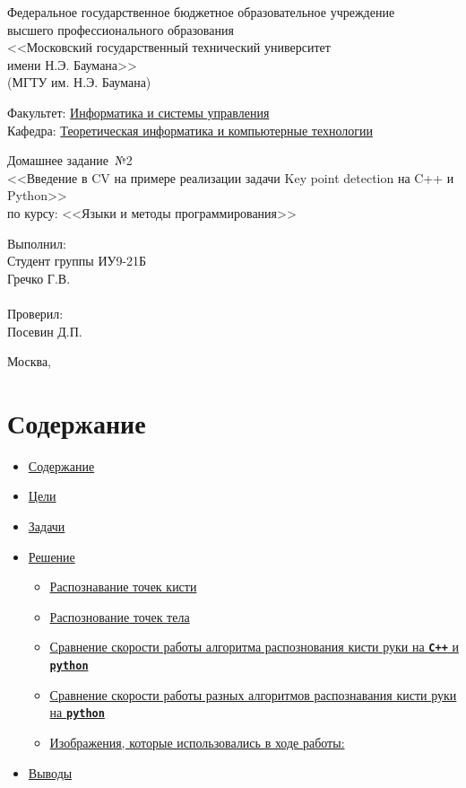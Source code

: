 \documentclass[
  12pt,
  a4paper,
]{article}
\providecommand{\tightlist}{%
  \setlength{\itemsep}{0pt}\setlength{\parskip}{0pt}}
\newcommand{\worktype}{Домашнее задание}
\newcommand{\thetitle}{Введение в CV на примере реализации задачи Key
point detection на C++ и Python}
\newcommand{\theauthor}{Гречко Г.В.}
\newcommand{\theteacher}{Посевин Д.П.}
\newcommand{\thegroup}{ИУ9-21Б}
\newcommand{\thecourse}{Языки и методы программирования}
\newcommand{\thenumber}{№2}
\renewcommand{\maketitle}
{
\newgeometry{
  left=0.7in,
  right=0.7in,
}
\begin{titlepage}
    \centering
    Федеральное государственное бюджетное образовательное учреждение\\
    высшего профессионального образования\\
    <<Московский государственный технический университет\\
    имени Н.Э. Баумана>>\\
    (МГТУ им. Н.Э. Баумана)
    \vspace{1cm}

    \flushleft

    Факультет: \underline{Информатика и системы управления}\\
    Кафедра: \underline{Теоретическая информатика и компьютерные технологии}

    \centering
    \topskip0pt
    \vspace*{\fill}
    \worktype\ \thenumber{}\\
    <<\thetitle{}>>\\
    по курсу: <<\thecourse{}>>
    \vspace*{\fill}
    \centering


    \hfill\begin{minipage}{0.4\linewidth}
        Выполнил:\\
        Студент группы \thegroup{}\\
        \theauthor\\
        \\
        Проверил:\\
        \theteacher
    \end{minipage}

    \vfill

    Москва, \the\year{}

\end{titlepage}
\restoregeometry{}
}
\begin{document}
\maketitle

\hypertarget{ux441ux43eux434ux435ux440ux436ux430ux43dux438ux435}{%
\section{Содержание}\label{ux441ux43eux434ux435ux440ux436ux430ux43dux438ux435}}

\begin{itemize}
\tightlist
\item
  \protect\hyperlink{ux441ux43eux434ux435ux440ux436ux430ux43dux438ux435}{Содержание}
\item
  \protect\hyperlink{ux446ux435ux43bux438}{Цели}
\item
  \protect\hyperlink{ux437ux430ux434ux430ux447ux438}{Задачи}
\item
  \protect\hyperlink{ux440ux435ux448ux435ux43dux438ux435}{Решение}

  \begin{itemize}
  \tightlist
  \item
    \protect\hyperlink{ux440ux430ux441ux43fux43eux437ux43dux430ux432ux430ux43dux438ux435-ux442ux43eux447ux435ux43a-ux43aux438ux441ux442ux438}{Распознавание
    точек кисти}
  \item
    \protect\hyperlink{ux440ux430ux441ux43fux43eux437ux43dux43eux432ux430ux43dux438ux435-ux442ux43eux447ux435ux43a-ux442ux435ux43bux430}{Распознование
    точек тела}
  \item
    \protect\hyperlink{ux441ux440ux430ux432ux43dux435ux43dux438ux435-ux441ux43aux43eux440ux43eux441ux442ux438-ux440ux430ux431ux43eux442ux44b-ux430ux43bux433ux43eux440ux438ux442ux43cux430-ux440ux430ux441ux43fux43eux437ux43dux43eux432ux430ux43dux438ux44f-ux43aux438ux441ux442ux438-ux440ux443ux43aux438-ux43dux430-c-ux438-python}{Сравнение
    скорости работы алгоритма распознования кисти руки на
    \textbf{\texttt{C++}} и \textbf{\texttt{python}}}
  \item
    \protect\hyperlink{ux441ux440ux430ux432ux43dux435ux43dux438ux435-ux441ux43aux43eux440ux43eux441ux442ux438-ux440ux430ux431ux43eux442ux44b-ux440ux430ux437ux43dux44bux445-ux430ux43bux433ux43eux440ux438ux442ux43cux43eux432-ux440ux430ux441ux43fux43eux437ux43dux430ux432ux430ux43dux438ux44f-ux43aux438ux441ux442ux438-ux440ux443ux43aux438-ux43dux430-python}{Сравнение
    скорости работы разных алгоритмов распознавания кисти руки на
    \textbf{\texttt{python}}}
  \item
    \protect\hyperlink{ux438ux437ux43eux431ux440ux430ux436ux435ux43dux438ux44f-ux43aux43eux442ux43eux440ux44bux435-ux438ux441ux43fux43eux43bux44cux437ux43eux432ux430ux43bux438ux441ux44c-ux432-ux445ux43eux434ux435-ux440ux430ux431ux43eux442ux44b}{Изображения,
    которые использовались в ходе работы:}
  \end{itemize}
\item
  \protect\hyperlink{ux432ux44bux432ux43eux434ux44b}{Выводы}
\end{itemize}
\end{document}
